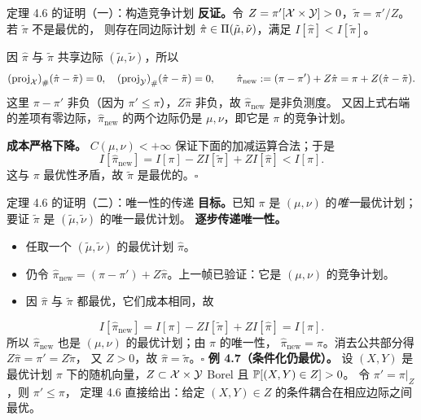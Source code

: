 \begin{frame}{定理 4.6 的证明（一）：构造竞争计划}
  \textbf{反证。}\proofskipnote 令 $Z=\pi'[\mathcal{X}\times\mathcal{Y}]>0$，$\tilde{\pi}=\pi'/Z$。若 $\tilde{\pi}$ 不是最优的，
  则存在同边际计划 $\hat{\pi}\in\Pi(\tilde{\mu},\tilde{\nu})$，满足 $I[\hat{\pi}]<I[\tilde{\pi}]$。

  因 $\hat{\pi}$ 与 $\tilde{\pi}$ 共享边际 $(\tilde{\mu},\tilde{\nu})$，所以
  \[
    {(\mathrm{proj}_{\mathcal{X}})}_{\#}(\hat{\pi}-\tilde{\pi})=0,\quad
    {(\mathrm{proj}_{\mathcal{Y}})}_{\#}(\hat{\pi}-\tilde{\pi})=0,\qquad
    \hat{\pi}_{\mathrm{new}}:=(\pi-\pi')+Z\hat{\pi}=\pi+Z(\hat{\pi}-\tilde{\pi}).
  \]
  这里 $\pi-\pi'$ 非负（因为 $\pi'\le\pi$），$Z\hat{\pi}$ 非负，故 $\hat{\pi}_{\mathrm{new}}$ 是非负测度。
  又因上式右端的差项有零边际，$\hat{\pi}_{\mathrm{new}}$ 的两个边际仍是 $\mu,\nu$，即它是 $\pi$ 的竞争计划。

  \textbf{成本严格下降。} $C(\mu,\nu)<+\infty$ 保证下面的加减运算合法；于是
  \[
    I[\hat{\pi}_{\mathrm{new}}]
    = I[\pi]-Z I[\tilde{\pi}]+Z I[\hat{\pi}]
    < I[\pi].
  \]
  这与 $\pi$ 最优性矛盾，故 $\tilde{\pi}$ 是最优的。\hfill$\square$
\end{frame}

\begin{frame}{定理 4.6 的证明（二）：唯一性的传递}
  \textbf{目标。}\proofskipnote 已知 $\pi$ 是 $(\mu,\nu)$ 的\emph{唯一}最优计划；要证 $\tilde{\pi}$ 是
  $(\tilde{\mu},\tilde{\nu})$ 的唯一最优计划。
  \textbf{逐步传递唯一性。}
  \begin{itemize}\small
    \item 任取一个 $(\tilde{\mu},\tilde{\nu})$ 的最优计划 $\hat{\pi}$。
    \item 仍令 $\hat{\pi}_{\mathrm{new}}=(\pi-\pi')+Z\hat{\pi}$。上一帧已验证：它是 $(\mu,\nu)$ 的竞争计划。
    \item 因 $\hat{\pi}$ 与 $\tilde{\pi}$ 都最优，它们成本相同，故
  \end{itemize}
  \[
    I[\hat{\pi}_{\mathrm{new}}]
    = I[\pi]-Z I[\tilde{\pi}]+Z I[\hat{\pi}]
    = I[\pi].
  \]
  所以 $\hat{\pi}_{\mathrm{new}}$ 也是 $(\mu,\nu)$ 的最优计划；由 $\pi$ 的唯一性，
  $\hat{\pi}_{\mathrm{new}}=\pi$。消去公共部分得 $Z\hat{\pi}=\pi'=Z\tilde{\pi}$，
  又 $Z>0$，故 $\hat{\pi}=\tilde{\pi}$。\hfill$\square$
  \textbf{例 4.7（条件化仍最优）。}
  设 $(X,Y)$ 是最优计划 $\pi$ 下的随机向量，$Z\subset\mathcal{X}\times\mathcal{Y}$ Borel 且 $\mathbb{P}[(X,Y)\in Z]>0$。
  令 $\pi' = \pi|_{Z}$，则 $\pi'\le\pi$，
  定理 4.6 直接给出：给定 $(X,Y)\in Z$ 的条件耦合在相应边际之间最优。
\end{frame}


